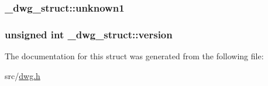 \hypertarget{struct__dwg__struct_ae1f454460b4d4e9c20afb8be966343d1}{
\subsubsection[{unknown1}]{ {\bf \-\_\-dwg\-\_\-struct\-::unknown1}}}\label{struct__dwg__struct_ae1f454460b4d4e9c20afb8be966343d1}
\hypertarget{struct__dwg__struct_a3894b5d2a325285dc2af923dd73133cb}{
\subsubsection[{version}]{\setlength{\rightskip}{0pt plus 5cm}unsigned int {\bf \-\_\-dwg\-\_\-struct\-::version}}}\label{struct__dwg__struct_a3894b5d2a325285dc2af923dd73133cb}


\-The documentation for this struct was generated from the following file\-:\begin{DoxyCompactItemize}
\item 
src/\hyperlink{dwg_8h}{dwg.\-h}\end{DoxyCompactItemize}
